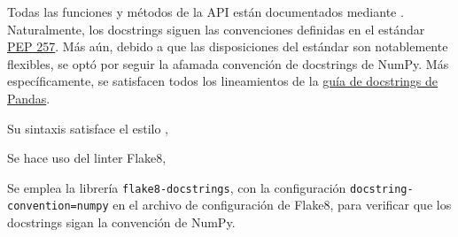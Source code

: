 
Todas las funciones y métodos de la \gls{API} están documentados mediante . Naturalmente, los docstrings siguen las convenciones definidas en el estándar \href{https://peps.python.org/pep-0257/}{\gls{PEP} 257}. Más aún, debido a que las disposiciones del estándar son notablemente flexibles, se optó por seguir la afamada convención de docstrings de \gls{NumPy}. Más específicamente, se satisfacen todos los lineamientos de la \href{https://python-sprints.github.io/pandas/guide/pandas_docstring.html}{guía de docstrings de \gls{Pandas}}.



Su sintaxis satisface el estilo ,



Se hace uso del linter \gls{Flake8},

Se emplea la librería \verb|flake8-docstrings|, con la configuración \verb|docstring-convention=numpy| en el archivo de configuración de Flake8, para verificar que los docstrings sigan la convención de NumPy.
